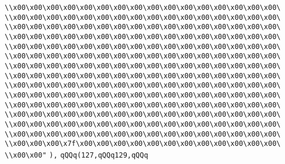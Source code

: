 \verb|\\x00\x00\x00\x00\x00\x00\x00\x00\x00\x00\x00\x00\x00\x00\x00\x00\|\newline
\verb|\\x00\x00\x00\x00\x00\x00\x00\x00\x00\x00\x00\x00\x00\x00\x00\x00\|\newline
\verb|\\x00\x00\x00\x00\x00\x00\x00\x00\x00\x00\x00\x00\x00\x00\x00\x00\|\newline
\verb|\\x00\x00\x00\x00\x00\x00\x00\x00\x00\x00\x00\x00\x00\x00\x00\x00\|\newline
\verb|\\x00\x00\x00\x00\x00\x00\x00\x00\x00\x00\x00\x00\x00\x00\x00\x00\|\newline
\verb|\\x00\x00\x00\x00\x00\x00\x00\x00\x00\x00\x00\x00\x00\x00\x00\x00\|\newline
\verb|\\x00\x00\x00\x00\x00\x00\x00\x00\x00\x00\x00\x00\x00\x00\x00\x00\|\newline
\verb|\\x00\x00\x00\x00\x00\x00\x00\x00\x00\x00\x00\x00\x00\x00\x00\x00\|\newline
\verb|\\x00\x00\x00\x00\x00\x00\x00\x00\x00\x00\x00\x00\x00\x00\x00\x00\|\newline
\verb|\\x00\x00\x00\x00\x00\x00\x00\x00\x00\x00\x00\x00\x00\x00\x00\x00\|\newline
\verb|\\x00\x00\x00\x00\x00\x00\x00\x00\x00\x00\x00\x00\x00\x00\x00\x00\|\newline
\verb|\\x00\x00\x00\x00\x00\x00\x00\x00\x00\x00\x00\x00\x00\x00\x00\x00\|\newline
\verb|\\x00\x00\x00\x00\x00\x00\x00\x00\x00\x00\x00\x00\x00\x00\x00\x00\|\newline
\verb|\\x00\x00\x00\x00\x00\x00\x00\x00\x00\x00\x00\x00\x00\x00\x00\x00\|\newline
\verb|\\x00\x00\x00\x7f\x00\x00\x00\x00\x00\x00\x00\x00\x00\x00\x00\x00\|\newline
\verb|\\x00\x00"|\newline
\verb|),|\newline
\verb|qQQq(127,qQQq129,qQQq|\newline
